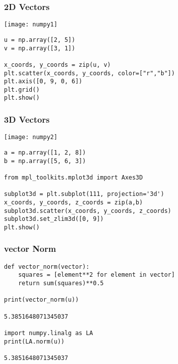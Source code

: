  \begin{frame}[fragile] \frametitle{2D Vectors}

\begin{center}
\texttt{[image: numpy1]}
\end{center}

\begin{lstlisting}
u = np.array([2, 5])
v = np.array([3, 1])

x_coords, y_coords = zip(u, v)
plt.scatter(x_coords, y_coords, color=["r","b"])
plt.axis([0, 9, 0, 6])
plt.grid()
plt.show()
\end{lstlisting}



\end{frame}

 \begin{frame}[fragile] \frametitle{3D Vectors}

\begin{center}
\texttt{[image: numpy2]}
\end{center}

\begin{lstlisting}
a = np.array([1, 2, 8])
b = np.array([5, 6, 3])

from mpl_toolkits.mplot3d import Axes3D

subplot3d = plt.subplot(111, projection='3d')
x_coords, y_coords, z_coords = zip(a,b)
subplot3d.scatter(x_coords, y_coords, z_coords)
subplot3d.set_zlim3d([0, 9])
plt.show()
\end{lstlisting}



\end{frame}


 \begin{frame}[fragile] \frametitle{vector Norm}

\begin{lstlisting}
def vector_norm(vector):
    squares = [element**2 for element in vector]
    return sum(squares)**0.5

print(vector_norm(u))

5.3851648071345037

import numpy.linalg as LA
print(LA.norm(u))

5.3851648071345037

\end{lstlisting}
\end{frame}

